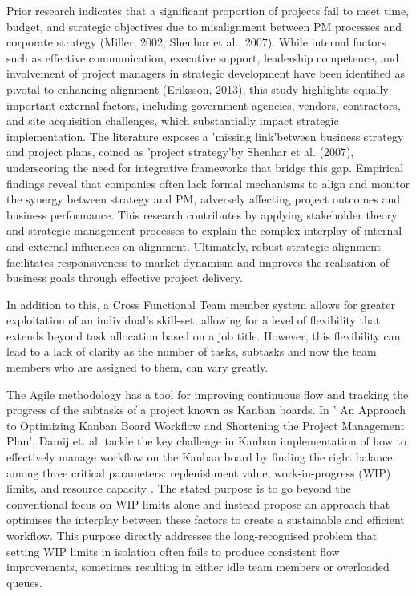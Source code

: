 \documentclass{report}
\begin{document}
Prior research indicates that a significant proportion of projects fail to meet time, budget, and strategic objectives due to misalignment between PM processes and corporate strategy (Miller, 2002; Shenhar et al., 2007). While internal factors such as effective communication, executive support, leadership competence, and involvement of project managers in strategic development have been identified as pivotal to enhancing alignment (Eriksson, 2013), this study highlights equally important external factors, including government agencies, vendors, contractors, and site acquisition challenges, which substantially impact strategic implementation. The literature exposes a 'missing link'between business strategy and project plans, coined as 'project strategy'by Shenhar et al. (2007), underscoring the need for integrative frameworks that bridge this gap. Empirical findings reveal that companies often lack formal mechanisms to align and monitor the synergy between strategy and PM, adversely affecting project outcomes and business performance. This research contributes by applying stakeholder theory and strategic management processes to explain the complex interplay of internal and external influences on alignment. Ultimately, robust strategic alignment facilitates responsiveness to market dynamism and improves the realisation of business goals through effective project delivery.

In addition to this, a Cross Functional Team member system allows for greater exploitation of an individual's skill-set, allowing for a level of flexibility that extends beyond task allocation based on a job title. However, this flexibility can lead to a lack of clarity as the number of tasks, subtasks and now the team members who are assigned to them, can vary greatly. 

The Agile methodology has a tool for improving continuous flow and tracking the progress of the subtasks of a project known as Kanban boards. In ' An Approach to Optimizing Kanban Board Workflow and Shortening the Project Management Plan', Damij et. al. tackle the key challenge in Kanban implementation of how to effectively manage workflow on the Kanban board by finding the right balance among three critical parameters: replenishment value, work-in-progress (WIP) limits, and resource capacity \parencite{damijApproachOptimizingKanban2024}. The stated purpose is to go beyond the conventional focus on WIP limits alone and instead propose an approach that optimises the interplay between these factors to create a sustainable and efficient workflow. This purpose directly addresses the long-recognised problem that setting WIP limits in isolation often fails to produce consistent flow improvements, sometimes resulting in either idle team members or overloaded queues.
\end{document}
